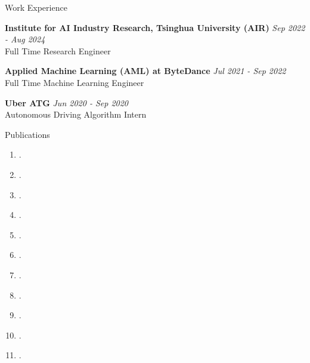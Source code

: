 \documentclass{resume} %
\begin{document}
\vspace{-0.5em} %


\begin{rSection}{Work Experience}

\textbf{Institute for AI Industry Research, Tsinghua University (AIR)} \hfill {\em Sep 2022 - Aug 2024}
\\
Full Time Research Engineer

\vspace{0.5em}

\textbf{Applied Machine Learning (AML) at ByteDance} \hfill {\em Jul 2021 - Sep 2022}
\\
Full Time Machine Learning Engineer

\vspace{0.5em}

\textbf{Uber ATG} \hfill {\em Jun 2020 - Sep 2020}
\\
Autonomous Driving Algorithm Intern

\end{rSection}

\begin{rSection}{Publications}

\begin{enumerate}[leftmargin=2em, itemsep=6pt, parsep=0pt, topsep=3pt]
    
    \item {}.
    \item {}.
    \item {}.
    \item {}.
    \item {}.
    \item {}.
    \item {}.
    \item {}.
    \item {}.
    \item {}.
    \item {}. 
\end{enumerate}

\end{rSection}
\end{document}

